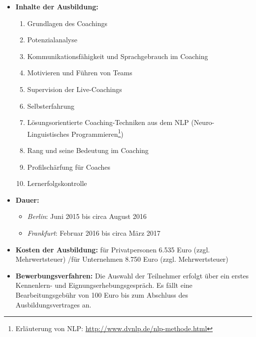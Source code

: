 \documentclass[11pt,a4paper]{article}
\begin{document}
	\begin{itemize}
	\item \textbf{Inhalte der Ausbildung:}

			\begin{enumerate}
			\item Grundlagen des Coachings
			\item Potenzialanalyse
			\item Kommunikationsfähigkeit und Sprachgebrauch im Coaching
			\item Motivieren und Führen von Teams
			\item Supervision der Live-Coachings
			\item Selbsterfahrung
			\item Lösungsorientierte Coaching-Techniken aus dem NLP (Neuro-Linguistisches Programmieren\footnote{Erläuterung von NLP: \textsf{\textcolor{MidnightBlue}{\url{http://www.dvnlp.de/nlp-methode.html}}}})
			\item Rang und seine Bedeutung im Coaching
			\item Profilschärfung für Coaches
			\item Lernerfolgskontrolle
			\end{enumerate}

	\item \textbf{Dauer:}

		\begin{itemize} 
		\item \textsl{Berlin}: Juni 2015 bis circa August 2016
		\item \textsl{Frankfurt}: Februar 2016 bis circa März 2017
		\end{itemize}

	\item \textbf{Kosten der Ausbildung:} für Privatpersonen 6.535 Euro (zzgl. Mehrwertsteuer) /für Unternehmen 8.750 Euro (zzgl. Mehrwertsteuer)

	\item \textbf{Bewerbungsverfahren:} Die Auswahl der Teilnehmer erfolgt über ein erstes Kennenlern- und Eignungserhebungsgespräch. Es fällt eine Bearbeitungsgebühr von 100 Euro bis zum Abschluss des Ausbildungsvertrages an.

	\end{itemize}

\end{document}
